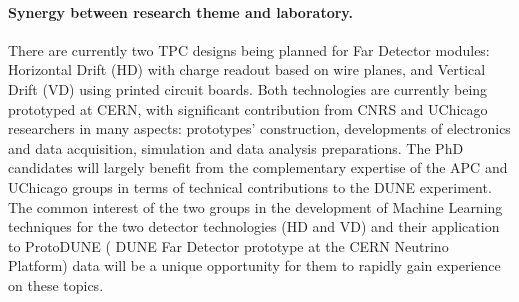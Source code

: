 \paragraph{Synergy between research theme and laboratory.}
There are currently two TPC designs being planned for Far Detector modules: Horizontal Drift (HD) with charge readout based on wire planes, and Vertical Drift (VD) using printed circuit boards.  Both technologies are currently being prototyped at CERN, with significant contribution from CNRS and UChicago researchers in many aspects: prototypes' construction, developments of electronics and data acquisition, simulation and data analysis preparations. The PhD candidates will largely benefit from the complementary expertise of the APC and UChicago groups in terms of technical contributions to the DUNE experiment. The common interest of the two groups in the development of Machine Learning techniques for the two detector technologies (HD and VD) and their application to ProtoDUNE ( DUNE Far Detector prototype at the CERN Neutrino Platform) data will be a unique opportunity for them to rapidly gain experience on these topics.



\clearpage



